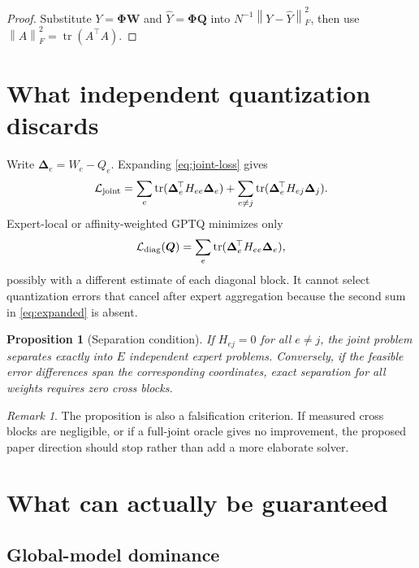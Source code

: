 \documentclass[11pt]{article}
\theoremstyle{plain}
\newtheorem{proposition}{Proposition}
\theoremstyle{definition}
\theoremstyle{remark}
\newtheorem{remark}{Remark}
\newcommand{\W}{\bm W}
\newcommand{\Q}{\bm Q}
\newcommand{\PhiM}{\bm\Phi}
\newcommand{\Err}{\bm\Delta}
\newcommand{\tr}{\operatorname{tr}}
\newcommand{\norm}[1]{\left\lVert#1\right\rVert}
\begin{document}
\begin{proof}
Substitute $Y=\PhiM\W$ and $\widehat Y=\PhiM\Q$ into $N^{-1}\norm{Y-\widehat Y}_F^2$, then use $\norm A_F^2=\tr(A^{\!\top}A)$.
\end{proof}

\section{What independent quantization discards}

Write $\Err_e=W_e-Q_e$.  Expanding \eqref{eq:joint-loss} gives
\begin{equation}\label{eq:expanded}
\mathcal L_{\rm joint}
=\sum_e\tr(\Err_e^{\!\top}H_{ee}\Err_e)
+\sum_{e\ne j}\tr(\Err_e^{\!\top}H_{ej}\Err_j).
\end{equation}
Expert-local or affinity-weighted GPTQ minimizes only
\begin{equation}\label{eq:diagonal}
  \mathcal L_{\rm diag}(\Q)=\sum_e\tr(\Err_e^{\!\top}H_{ee}\Err_e),
\end{equation}
possibly with a different estimate of each diagonal block.  It cannot select quantization errors that cancel after expert aggregation because the second sum in \eqref{eq:expanded} is absent.

\begin{proposition}[Separation condition]\label{prop:separation}
If $H_{ej}=0$ for all $e\ne j$, the joint problem separates exactly into $E$ independent expert problems.  Conversely, if the feasible error differences span the corresponding coordinates, exact separation for all weights requires zero cross blocks.
\end{proposition}

\begin{remark}
The proposition is also a falsification criterion.  If measured cross blocks are negligible, or if a full-joint oracle gives no improvement, the proposed paper direction should stop rather than add a more elaborate solver.
\end{remark}

\section{What can actually be guaranteed}

\subsection{Global-model dominance}
\end{document}
